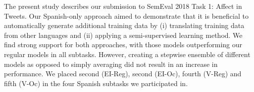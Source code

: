 The present study describes our submission to SemEval 2018 Task 1: Affect in Tweets. Our Spanish-only approach aimed to demonstrate that it is beneficial to automatically generate additional training data by (i) translating training data from other languages and (ii) applying a semi-supervised learning method. We find strong support for both approaches, with those models outperforming our regular models in all subtasks. However, creating a stepwise ensemble of different models as opposed to simply averaging did not result in an increase in performance. We placed second (EI-Reg), second (EI-Oc), fourth (V-Reg) and fifth (V-Oc) in the four Spanish subtasks we participated in.

